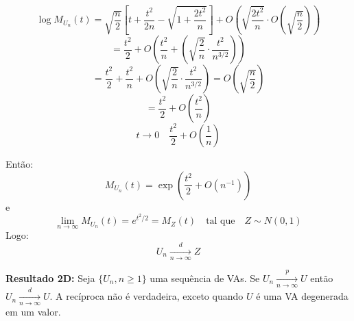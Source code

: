 \[
\log M_{U_n}(t) = \sqrt{\frac{n}{2}} \left[ t + \frac{t^2}{2n} - \sqrt{1 + \frac{2t^2}{n}} \right] + O\left( \sqrt{\frac{2t^2}{n}} \cdot O\left( \sqrt{\frac{n}{2}} \right) \right)
\]
\[
= \frac{t^2}{2} + O\left( \frac{t^2}{n} + \left( \sqrt{\frac{2}{n}} \cdot \frac{t^2}{n^{3/2}} \right) \right)
\]
\[
= \frac{t^2}{2} + \frac{t^2}{n} + O\left( \sqrt{\frac{2}{n}} \cdot \frac{t^2}{n^{3/2}} \right) = O\left( \sqrt{\frac{n}{2}} \right)
\]
\[
= \frac{t^2}{2} + O\left( \frac{t^2}{n} \right)
\]
\[
t \to 0 \quad \frac{t^2}{2} + O\left( \frac{1}{n} \right)
\]

Então:
\[
M_{U_n}(t) = \exp\left( \frac{t^2}{2} + O(n^{-1}) \right)
\]
e
\[
\lim_{n \to \infty} M_{U_n}(t) = e^{t^2/2} = M_Z(t) \quad \text{tal que} \quad Z \sim N(0,1)
\]
Logo:
\[
U_n \xrightarrow[n \to \infty]{d} Z
\]

\textbf{Resultado 2D:} Seja $\{U_n, n \geq 1\}$ uma sequência de VAs. Se $U_n \xrightarrow[n \to \infty]{p} U$ então $U_n \xrightarrow[n \to \infty]{d} U$. A recíproca não é verdadeira, exceto quando $U$ é uma VA degenerada em um valor.